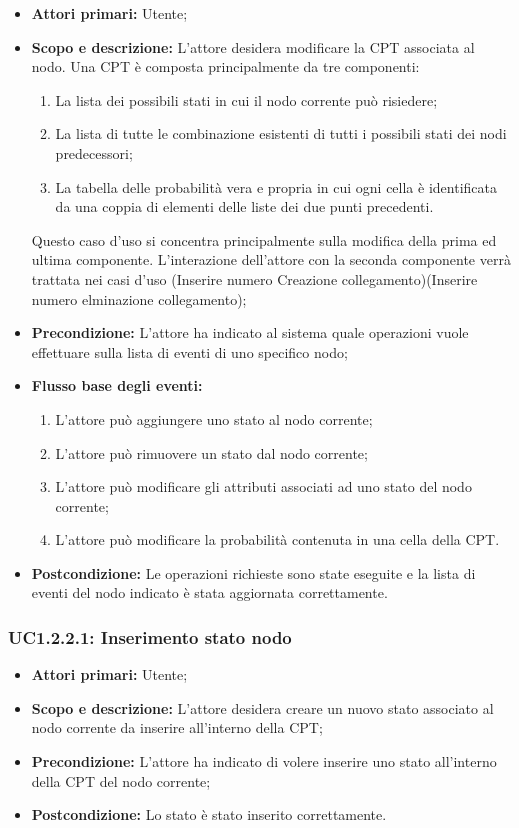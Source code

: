 \begin{itemize} 
	\item{\textbf{Attori primari:} Utente;} 
	\item{\textbf{Scopo e descrizione:} L'attore desidera modificare la CPT associata al nodo. Una CPT è composta principalmente da tre componenti: 
	\begin{enumerate} 
		\item{La lista dei possibili stati in cui il nodo corrente può risiedere;} 
		\item{La lista di tutte le combinazione esistenti di tutti i possibili stati dei nodi predecessori;} 
		\item{La tabella delle probabilità vera e propria in cui ogni cella è identificata da una coppia di elementi delle liste dei due punti precedenti.} 
	\end{enumerate} 
	Questo caso d'uso si concentra principalmente sulla modifica della prima ed ultima componente. L'interazione dell'attore con la seconda componente verrà trattata nei casi d'uso (Inserire numero Creazione collegamento)(Inserire numero elminazione collegamento);
} 
	\item{\textbf{Precondizione:} L'attore ha indicato al sistema quale operazioni vuole effettuare sulla lista di eventi di uno specifico nodo;} 
	\item{\textbf{Flusso base degli eventi:} } 
	\begin{enumerate} 
		\item{L'attore può aggiungere uno stato al nodo corrente;} 
		\item{L'attore può rimuovere un stato dal nodo corrente;} 
		\item{L'attore può modificare gli attributi associati ad uno stato del nodo corrente;} 
		\item{L'attore può modificare la probabilità contenuta in una cella della CPT.} 
	\end{enumerate} 
	\item{\textbf{Postcondizione:} Le operazioni richieste sono state eseguite e la lista di eventi del nodo indicato è stata aggiornata correttamente.} 
\end{itemize} 
\subsubsection{UC1.2.2.1: Inserimento stato nodo} 
\begin{itemize} 
	\item{\textbf{Attori primari:} Utente;} 
	\item{\textbf{Scopo e descrizione:} L'attore desidera creare un nuovo stato associato al nodo corrente da inserire all'interno della CPT;} 
	\item{\textbf{Precondizione:} L'attore ha indicato di volere inserire uno stato all'interno della CPT del nodo corrente;} 
	\item{\textbf{Postcondizione:} Lo stato è stato inserito correttamente.} 
\end{itemize} 
